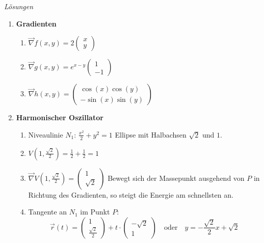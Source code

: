 \clearpage
\emph{Lösungen}


\begin{enumerate}
	\item \textbf{Gradienten}
	      \begin{enumerate}
		      \item \( \vec{\nabla} f(x, y) = 2 \begin{pmatrix} x \\ y \end{pmatrix} \)
		      \item \( \vec{\nabla} g(x, y) = e^{x - y} \begin{pmatrix} 1 \\ -1 \end{pmatrix} \)
		      \item \( \vec{\nabla} h(x, y) = \begin{pmatrix}
			            \cos(x) \cos(y) \\
			            -\sin(x) \sin(y)
		            \end{pmatrix} \)
	      \end{enumerate}

	\item \textbf{Harmonischer Oszillator}
	      \begin{enumerate}
		      \item Niveaulinie \( N_1 \): \( \frac{x^2}{2} + y^2 = 1 \)
		            Ellipse mit Halbachsen \( \sqrt{2} \) und \( 1 \).
		      \item \( V\left(1, \frac{\sqrt{2}}{2}\right) = \frac{1}{2} + \frac{1}{2} = 1 \)
		      \item \( \vec{\nabla} V\left(1, \frac{\sqrt{2}}{2}\right) = \begin{pmatrix} 1 \\ \sqrt{2} \end{pmatrix} \) Bewegt sich der Massepunkt ausgehend von \( P \) in Richtung des Gradienten, so steigt die Energie am schnellsten an.
		      \item Tangente an \( N_1 \) im Punkt \( P \):
		            \[
			            \vec{r}(t) = \begin{pmatrix} 1 \\ \frac{\sqrt{2}}{2} \end{pmatrix} + t \cdot \begin{pmatrix} -\sqrt{2} \\ 1 \end{pmatrix}
			            \quad \text{oder} \quad y = -\frac{\sqrt{2}}{2} x + \sqrt{2}
		            \]
	      \end{enumerate}


\end{enumerate}
